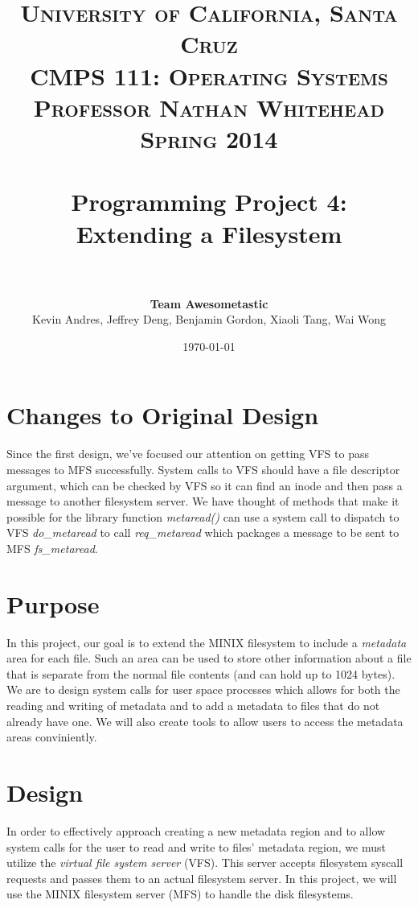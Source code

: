 \documentclass[paper=a4, fontsize=11pt]{scrartcl}
\title{	
\normalfont \normalsize 
\textsc{University of California, Santa Cruz\\CMPS 111: Operating Systems\\Professor Nathan Whitehead\\Spring 2014} \\ [25pt] %
\horrule{0.5pt} \\[0.4cm] %
\huge Programming Project 4:\\ Extending a Filesystem \\ %
\horrule{2pt} \\[0.5cm] %
}
\author{{\bf Team Awesometastic} \\Kevin Andres, Jeffrey Deng, Benjamin Gordon, Xiaoli Tang, Wai Wong} %
\date{\normalsize\today} %
\numberwithin{equation}{section} %
\numberwithin{figure}{section} %
\numberwithin{table}{section} %
\begin{document}
\maketitle %



\section{Changes to Original Design}
Since the first design, we've focused our attention on getting VFS to pass messages to MFS successfully. System calls to VFS should have a file descriptor argument, which can be checked by VFS so it can find an inode and then pass a message to another filesystem server. We have thought of methods that make it possible for the library function {\it metaread()} can use a system call to dispatch to VFS {\it do\_metaread} to call {\it req\_metaread} which packages a message to be sent to MFS {\it fs\_metaread}.





\section{Purpose}
In this project, our goal is to extend the MINIX filesystem to include a {\it metadata} area for each file. Such an area can be used to store other information about a file that is separate from the normal file contents (and can hold up to 1024 bytes). We are to design system calls for user space processes which allows for both the reading and writing of metadata and to add a metadata to files that do not already have one. We will also create tools to allow users to access the metadata areas conviniently.


\section{Design}
In order to effectively approach creating a new metadata region and to allow system calls for the user to read and write to files' metadata region, we must utilize the {\it virtual file system server} (VFS). This server accepts filesystem syscall requests and passes them to an actual filesystem server. In this project, we will use the MINIX filesystem server (MFS) to handle the disk filesystems.
\end{document}
